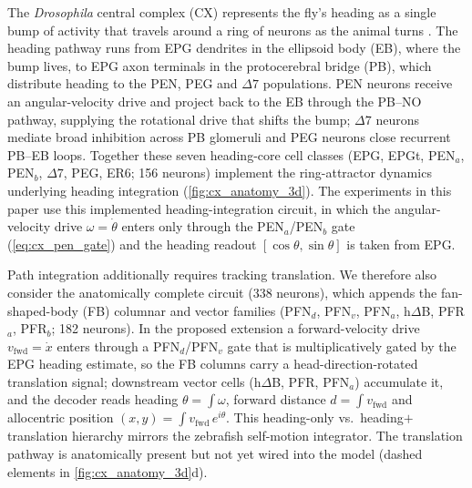\documentclass[11pt]{article}
\begin{document}
The \emph{Drosophila} central complex (CX) represents the fly's heading as a
single bump of activity that travels around a ring of neurons as the animal
turns \citep{seelig2015,kim2017,green2017}. The heading pathway runs from EPG
dendrites in the ellipsoid body (EB), where the bump lives, to EPG axon
terminals in the protocerebral bridge (PB), which distribute heading to the
PEN, PEG and $\Delta7$ populations. PEN neurons receive an angular-velocity
drive and project back to the EB through the PB--NO pathway, supplying the
rotational drive that shifts the bump; $\Delta7$ neurons mediate broad
inhibition across PB glomeruli and PEG neurons close recurrent PB--EB loops.
Together these seven heading-core cell classes (EPG, EPGt, PEN$_a$, PEN$_b$,
$\Delta7$, PEG, ER6; 156 neurons) implement the ring-attractor dynamics
underlying heading integration (\cref{fig:cx_anatomy_3d}). The experiments in
this paper use this implemented heading-integration circuit, in which the
angular-velocity drive $\omega=\dot\theta$ enters only through the
PEN$_a$/PEN$_b$ gate (\cref{eq:cx_pen_gate}) and the heading readout
$[\cos\theta,\sin\theta]$ is taken from EPG.

Path integration additionally requires tracking translation. We therefore also
consider the anatomically complete circuit (338 neurons), which appends the
fan-shaped-body (FB) columnar and vector families (PFN$_d$, PFN$_v$, PFN$_a$,
h$\Delta$B, PFR$_a$, PFR$_b$; 182 neurons). In the proposed extension a
forward-velocity drive $v_{\mathrm{fwd}}=\dot x$ enters through a PFN$_d$/PFN$_v$
gate that is multiplicatively gated by the EPG heading estimate, so the FB
columns carry a head-direction-rotated translation signal; downstream vector
cells (h$\Delta$B, PFR, PFN$_a$) accumulate it, and the decoder reads heading
$\theta=\int\omega$, forward distance $d=\int v_{\mathrm{fwd}}$ and allocentric
position $(x,y)=\int v_{\mathrm{fwd}}\,e^{i\theta}$. This heading-only
vs.\ heading$+$translation hierarchy mirrors the zebrafish self-motion
integrator. The translation pathway is anatomically present but not yet wired
into the model (dashed elements in \cref{fig:cx_anatomy_3d}d).
\end{document}
